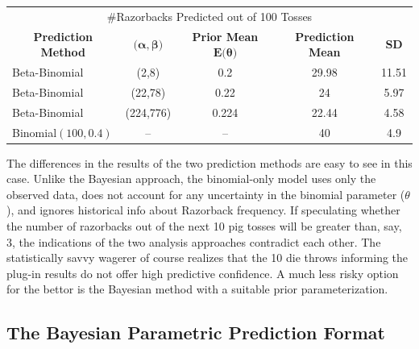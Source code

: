 \documentclass[12pt, a4paper]{article}
\begin{document}
\vspace{2cm}


\vspace{1cm}

\begin{center}
  \begin{tabular}{l c c c c }
  \toprule
  \multicolumn{5}{c}{\large \#Razorbacks Predicted out of 100 Tosses}          \\
  \multicolumn{1}{c}{\textbf{Prediction Method}} & \multicolumn{1}{c}{$\textbf{(}\boldsymbol\alpha,\boldsymbol\beta\textbf{)}$}  & \multicolumn{1}{c}{\textbf{Prior Mean }$\textbf{E(}\boldsymbol\theta\textbf{)}$}  & \multicolumn{1}{c}{\textbf{Prediction Mean}} & \multicolumn{1}{c}{\textbf{SD}}\\
        \midrule
        Beta-Binomial & (2,8) & 0.2 & 29.98 & 11.51 \\
        \midrule
        Beta-Binomial & (22,78) & 0.22 & 24 & 5.97\\
        \midrule
        Beta-Binomial & (224,776) & 0.224 & 22.44 & 4.58 \\
        \midrule
        Binomial$(100,0.4)$ & -- & -- & 40 & 4.9 \\
  \bottomrule
  \end{tabular}
\end{center}


\noindent The differences in the results of the two prediction methods are easy to see in this case. Unlike the Bayesian approach, the binomial-only model uses only the observed data, does not account for any uncertainty in the binomial parameter ($\theta$), and ignores historical info about Razorback frequency.  If speculating whether the number of razorbacks out of the next 10 pig tosses will be greater than, say, 3, the indications of the two analysis approaches contradict each other.  The statistically savvy wagerer of course realizes that the 10 die throws informing the plug-in results do not offer high predictive confidence.  A much less risky option for the bettor is the Bayesian method with a suitable prior parameterization.


\clearpage

  \subsection{The Bayesian Parametric Prediction Format}
\end{document}
